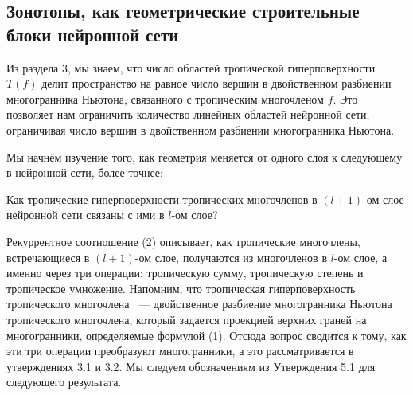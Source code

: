 \documentclass[russian]{lecture-notes}
\begin{document}
	\subsection{Зонотопы, как геометрические строительные блоки нейронной сети}
	
	Из раздела 3, мы знаем, что число областей тропической гиперповерхности $T(f)$ делит пространство на равное число вершин в двойственном разбиении многогранника Ньютона, связанного с тропическим многочленом $f$. Это позволяет нам ограничить количество линейных областей нейронной сети, ограничивая число вершин в двойственном разбиении многогранника Ньютона. 
	
	Мы начнём изучение того, как геометрия меняется от одного слоя к следующему в нейронной сети, более точнее:
	
	\begin{Question}
		Как тропические гиперповерхности тропических многочленов в $(l + 1)$-ом слое нейронной сети связаны с ими в $l$-ом слое?
	\end{Question}
	
	Рекуррентное соотношение (2) описывает, как тропические многочлены, встречающиеся в $(l + 1)$-ом слое, получаются из многочленов в $l$-ом слое, а именно через три операции: тропическую сумму, тропическую степень и тропическое умножение. Напомним, что тропическая гиперповерхность тропического многочлена ~--- двойственное разбиение многогранника Ньютона тропического многочлена, который задается проекцией верхних граней на многогранники, определяемые формулой (1). Отсюда вопрос сводится к тому, как эти три операции преобразуют многогранники, а это рассматривается в утверждениях 3.1 и 3.2. Мы следуем обозначениям из Утверждения 5.1 для следующего результата.
	
\end{document}
